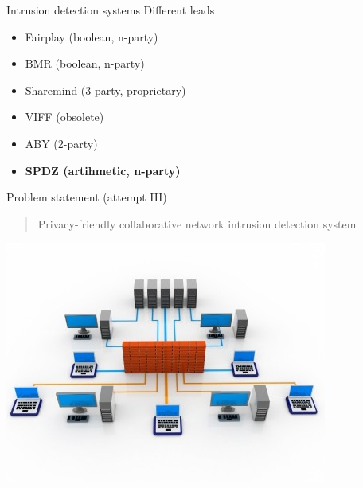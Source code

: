 \documentclass[11pt,t]{beamer}
\begin{document}
\begin{frame}{Intrusion detection systems}
Different leads
\begin{itemize}
    \item Fairplay (boolean, n-party)
    \item BMR (boolean, n-party)
    \item Sharemind (3-party, proprietary)
    \item VIFF (obsolete)
    \item ABY (2-party)
    \item \bf{SPDZ} (artihmetic, n-party)
\end{itemize}
\end{frame}
\begin{frame}[plain,c]{Problem statement (attempt III)}
\begin{center}
\begin{quote}
    Privacy-friendly collaborative network intrusion detection system
\end{quote}
	\includegraphics[width=.6\textwidth]{nids}
\end{center}
\end{frame}
\end{document}
